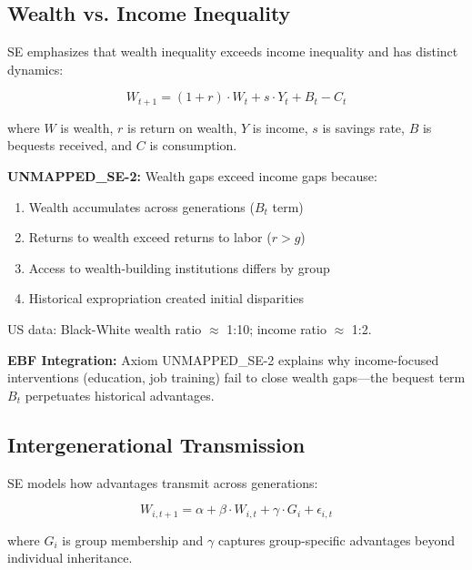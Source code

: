 \subsection{Wealth vs. Income Inequality}
\label{subsec:se-wealth}

SE emphasizes that wealth inequality exceeds income inequality and has distinct dynamics:

\begin{equation}
W_{t+1} = (1 + r) \cdot W_t + s \cdot Y_t + B_t - C_t
\label{eq:se-wealth}
\end{equation}

where $W$ is wealth, $r$ is return on wealth, $Y$ is income, $s$ is savings rate, $B$ is bequests received, and $C$ is consumption.

\begin{axiom}
\label{ax:se-2}
\textbf{UNMAPPED_SE-2:} Wealth gaps exceed income gaps because:
\begin{enumerate}
    \item Wealth accumulates across generations ($B_t$ term)
    \item Returns to wealth exceed returns to labor ($r > g$)
    \item Access to wealth-building institutions differs by group
    \item Historical expropriation created initial disparities
\end{enumerate}
US data: Black-White wealth ratio $\approx$ 1:10; income ratio $\approx$ 1:2.
\end{axiom}

\textbf{EBF Integration:} Axiom UNMAPPED_SE-2 explains why income-focused interventions (education, job training) fail to close wealth gaps---the bequest term $B_t$ perpetuates historical advantages.

\subsection{Intergenerational Transmission}
\label{subsec:se-intergenerational}

SE models how advantages transmit across generations:

\begin{equation}
W_{i,t+1} = \alpha + \beta \cdot W_{i,t} + \gamma \cdot G_i + \epsilon_{i,t}
\label{eq:se-transmission}
\end{equation}

where $G_i$ is group membership and $\gamma$ captures group-specific advantages beyond individual inheritance.

